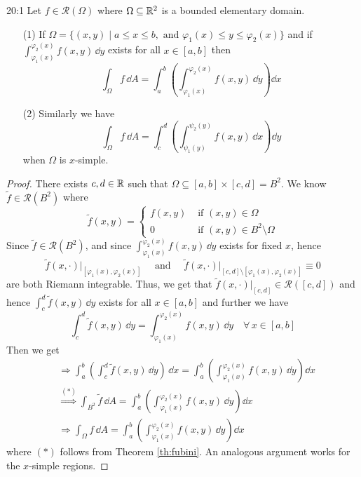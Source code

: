 \documentclass[../Analysis-3.tex]{subfiles}
\begin{document}
\begin{Thm}{}{20:1}
  Let $f \in \mathscr{R}(\Omega)$ where $\Omega \subseteq \mathbb{R}^2$ is a bounded elementary domain.
  \begin{enumerate}
    \item[(1)] If $\Omega = \{ (x,y) \mid a \leq x \leq b, \mbox{ and } \varphi_1(x) \leq y \leq \varphi_2(x) \}$ and if $\displaystyle{\int_{\varphi_1(x)}^{\varphi_2(x)}f(x,y) \, \dd
          y}$ exists for all $x \in [a,b]$ then
      \[
        \int_{\Omega} f \, \dd A = \int_a^b \left( \int_{\varphi_1(x)}^{\varphi_2(x)} f(x,y) \, \dd y\right) \dd x
      \]

    \item[(2)] Similarly we have
      \[
        \int_{\Omega} f \, \dd A = \int_c^d \left( \int_{\psi_1(y)}^{\psi_2(y)} f(x,y) \, \dd x\right) \dd y
      \]
      when $\Omega$ is $x$-simple.
  \end{enumerate}
\end{Thm}
\begin{proof}
  There exists $c,d \in \mathbb{R}$ such that $\Omega \subseteq [a,b] \times [c,d] = B^2$. We know $\tilde{f} \in \mathscr{R}(B^2)$ where
  \[
    \tilde{f}(x,y) = \begin{cases}
      f(x,y) & \mbox{ if } (x,y) \in \Omega               \\
      0      & \mbox{ if } (x,y) \in B^2 \setminus \Omega
    \end{cases}
  \]
  Since $\tilde{f} \in \mathscr{R}(B^2)$, and since $\displaystyle{\int_{\varphi_1(x)}^{\varphi_2(x)} f(x,y) \, \dd y}$ exists for fixed $x$, hence
  \[
    \tilde{f}(x,\cdot)\big\vert_{[\varphi_1(x),\varphi_2(x)]} \quad \mbox{ and } \quad \tilde{f}(x,\cdot)\big\vert_{[c,d]\setminus[\varphi_1(x),\varphi_2(x)]} \equiv 0
  \]
  are both Riemann integrable. Thus, we get that $\tilde{f}(x,\cdot)\vert_{[c,d]} \in \mathscr{R}([c,d])$ and hence $\displaystyle{\int_c^d \tilde{f}(x,y) \, \dd y}$ exists for all $x \in [a,b]$ and further we have
  \[
    \int_c^d \tilde{f}(x,y) \, \dd y = \int_{\varphi_1(x)}^{\varphi_2(x)} f(x,y) \, \dd y \quad \forall \, x \in [a,b]
  \]
  Then we get
  \begin{align*}
     & \Longrightarrow \int_a^b \left( \int_c^d \tilde{f}(x,y) \, \dd y\right)\, \dd x = \int_a^b \left( \int_{\varphi_1(x)}^{\varphi_2(x)} f(x,y) \, \dd y\right) \dd x \\
     & \overset{(*)}{\Longrightarrow} \int_{B^2} \tilde{f} \, \dd A = \int_a^b \left( \int_{\varphi_1(x)}^{\varphi_2(x)} f(x,y) \, \dd y\right) \dd x                    \\
     & \Longrightarrow \int_{\Omega} f \, \dd A = \int_a^b \left( \int_{\varphi_1(x)}^{\varphi_2(x)} f(x,y) \, \dd y\right) \dd x
  \end{align*}
  where $(*)$ follows from Theorem \ref{th:fubini}. An analogous argument works for the $x$-simple regions.
\end{proof}
\end{document}
